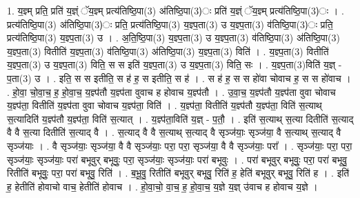 \documentclass[17pt]{extarticle}
\begin{document}
1. य॒ज्ञ्म् प्रति॒ प्रति॑ य॒ज्ञ्ं ॅय॒ज्ञ्म् प्रत्य॑तिष्ठि॒पा(3) अ॑तिष्ठि॒पा(3)ः प्रति॑ य॒ज्ञ्ं ॅय॒ज्ञ्म् प्रत्य॑तिष्ठि॒पा(3)ः । . प्रत्य॑तिष्ठि॒पा(3) अ॑तिष्ठि॒पा(3)ः प्रति॒ प्रत्य॑तिष्ठि॒पा(3) य॒ज्ञ्प॒ता(3) ‌उ य॒ज्ञ्प॒ता(3) व॑तिष्ठि॒पा(3)ः प्रति॒ प्रत्य॑तिष्ठि॒पा(3) य॒ज्ञ्प॒ता(3) ‌उ । . अ॒ति॒ष्ठि॒पा(3) य॒ज्ञ्प॒ता(3) ‌उ य॒ज्ञ्प॒ता(3)‌ व॑तिष्ठि॒पा(3) अ॑तिष्ठि॒पा(3) य॒ज्ञ्प॒ता(3) ‌वितीति॑ य॒ज्ञ्प॒ता(3) ‌व॑तिष्ठि॒पा(3) अ॑तिष्ठि॒पा(3) य॒ज्ञ्प॒ता(3) ‌विति॑ । . य॒ज्ञ्प॒ता(3) ‌वितीति॑ य॒ज्ञ्प॒ता(3) ‌उ य॒ज्ञ्प॒ता(3) ‌विति॒ स स इति॑ य॒ज्ञ्प॒ता(3) ‌उ य॒ज्ञ्प॒ता(3) ‌विति॒ सः । . य॒ज्ञ्प॒ता(3)विति॑ य॒ज्ञ् - प॒ता(3) उ । . इति॒ स स इतीति॒ स ह॑ ह॒ स इतीति॒ स ह॑ । . स ह॑ ह॒ स स हो॑वा चोवाच ह॒ स स हो॑वाच । . हो॒वा॒ चो॒वा॒च॒ ह॒ हो॒वा॒च॒ य॒ज्ञ्प॑तौ य॒ज्ञ्प॑ता वुवाच ह होवाच य॒ज्ञ्प॑तौ । . उ॒वा॒च॒ य॒ज्ञ्प॑तौ य॒ज्ञ्प॑ता वुवा चोवाच य॒ज्ञ्प॑ता॒ वितीति॑ य॒ज्ञ्प॑ता वुवा चोवाच य॒ज्ञ्प॑ता॒ विति॑ । . य॒ज्ञ्प॑ता॒ वितीति॑ य॒ज्ञ्प॑तौ य॒ज्ञ्प॑ता॒ विति॑ स॒त्याथ् स॒त्यादिति॑ य॒ज्ञ्प॑तौ य॒ज्ञ्प॑ता॒ विति॑ स॒त्यात् । . य॒ज्ञ्प॑ता॒विति॑ य॒ज्ञ् - प॒तौ॒ । . इति॑ स॒त्याथ् स॒त्या दितीति॑ स॒त्याद् वै वै स॒त्या दितीति॑ स॒त्याद् वै । . स॒त्याद् वै वै स॒त्याथ् स॒त्याद् वै सृञ्ज॑याः॒ सृञ्ज॑या॒ वै स॒त्याथ् स॒त्याद् वै सृञ्ज॑याः । . वै सृञ्ज॑याः॒ सृञ्ज॑या॒ वै वै सृञ्ज॑याः॒ परा॒ परा॒ सृञ्ज॑या॒ वै वै सृञ्ज॑याः॒ परा᳚ । . सृञ्ज॑याः॒ परा॒ परा॒ सृञ्ज॑याः॒ सृञ्ज॑याः॒ परा॑ बभूवुर् बभूवुः॒ परा॒ सृञ्ज॑याः॒ सृञ्ज॑याः॒ परा॑ बभूवुः । . परा॑ बभूवुर् बभूवुः॒ परा॒ परा॑ बभूवु॒ रितीति॑ बभूवुः॒ परा॒ परा॑ बभूवु॒ रिति॑ । . ब॒भू॒वु॒ रितीति॑ बभूवुर् बभूवु॒ रिति॑ ह॒ हेति॑ बभूवुर् बभूवु॒ रिति॑ ह । . इति॑ ह॒ हेतीति॑ होवाचो वाच॒ हेतीति॑ होवाच । . हो॒वा॒चो॒ वा॒च॒ ह॒ हो॒वा॒च॒ य॒ज्ञे य॒ज्ञ् उ॑वाच ह होवाच य॒ज्ञे । \newline
\end{document}
